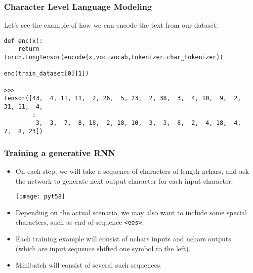 \begin{frame}[fragile] \frametitle{Character Level Language Modeling}

Let's see the example of how we can encode the text from our dataset:
\begin{lstlisting}
def enc(x):
    return torch.LongTensor(encode(x,voc=vocab,tokenizer=char_tokenizer))

enc(train_dataset[0][1])

>>>
tensor([43,  4, 11, 11,  2, 26,  5, 23,  2, 38,  3,  4, 10,  9,  2, 31, 11,  4,
        :
         3,  3,  7,  8, 18,  2, 18, 10,  3,  3,  8,  2,  4, 18,  4,  7,  8, 23])
\end{lstlisting}

\end{frame}


\begin{frame}[fragile] \frametitle{Training a generative RNN}

\begin{itemize}
\item On each step, we will take a sequence of characters of length nchars, and ask the network to generate next output character for each input character:

\begin{center}
\texttt{[image: pyt58]}
\end{center}

\item Depending on the actual scenario, we may also want to include some special characters, such as end-of-sequence \lstinline|<eos>|. 
\item Each training example will consist of nchars inputs and nchars outputs (which are input sequence shifted one symbol to the left). 
\item Minibatch will consist of several such sequences.
\end{itemize}

\end{frame}

